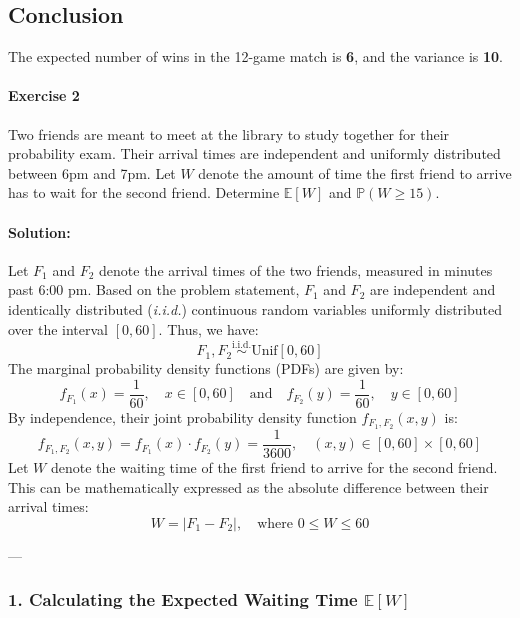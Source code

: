 \documentclass[a4paper,12pt]{article}
\newcommand{\mb}[1]{\mathbb{#1}}
\begin{document}
\subsection*{Conclusion}
The expected number of wins in the 12-game match is \textbf{6}, and the variance is \textbf{10}.

\paragraph{Exercise 2}  Two friends are meant to meet at the library to study together for their probability exam. Their arrival times are independent and uniformly distributed between 6pm and 7pm. Let $W$ denote the amount of time the first friend to arrive has to wait for the second friend. Determine $\mb E[W]$ and $\mb P \left( W \ge 15 \right)$.

\paragraph{Solution:}
Let $F_1$ and $F_2$ denote the arrival times of the two friends, measured in minutes past 6:00 pm. Based on the problem statement, $F_1$ and $F_2$ are independent and identically distributed (\textit{i.i.d.}) continuous random variables uniformly distributed over the interval $[0, 60]$. 
Thus, we have:
\[
F_1, F_2 \overset{\text{i.i.d.}}{\sim} \text{Unif}[0, 60]
\]
The marginal probability density functions (PDFs) are given by:
\[
f_{F_1}(x) = \frac{1}{60}, \quad x \in [0, 60] \quad \text{and} \quad f_{F_2}(y) = \frac{1}{60}, \quad y \in [0, 60]
\]
By independence, their joint probability density function $f_{F_1, F_2}(x, y)$ is:
\[
f_{F_1, F_2}(x, y) = f_{F_1}(x) \cdot f_{F_2}(y) = \frac{1}{3600}, \quad (x, y) \in [0, 60] \times [0, 60]
\]
Let $W$ denote the waiting time of the first friend to arrive for the second friend. This can be mathematically expressed as the absolute difference between their arrival times:
\[
W = |F_1 - F_2|, \quad \text{where } 0 \le W \le 60
\]

---

\subsubsection*{1. Calculating the Expected Waiting Time $\mathbb{E}[W]$}
\end{document}
